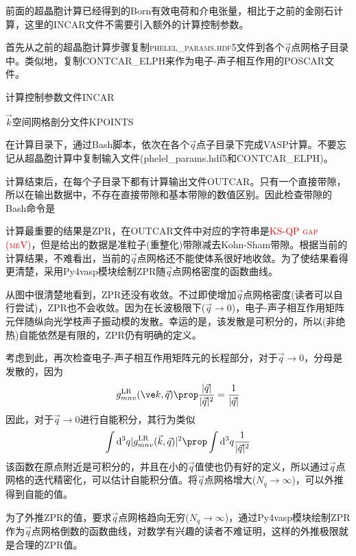 前面的超晶胞计算已经得到的\textrm{Born}有效电荷和介电张量，相比于之前的金刚石计算，这里的\textrm{INCAR}文件不需要引入额外的计算控制参数。

首先从之前的超晶胞计算步骤复制\textsc{phelel\_params.hdf5}文件到各个$\vec q$点网格子目录中。类似地，复制\textrm{CONTCAR\_ELPH}来作为电子-声子相互作用的\textrm{POSCAR}文件。

计算控制参数文件\textrm{INCAR}

$\vec k$空间网格剖分文件\textrm{KPOINTS}

在计算目录下，通过\textrm{Bash}脚本，依次在各个$\vec q$点子目录下完成\textrm{VASP}计算。不要忘记从超晶胞计算中复制输入文件(\textrm{phelel\_params.hdf5}和\textrm{CONTCAR\_ELPH})。

计算结束后，在每个子目录下都有计算输出文件\textrm{OUTCAR}。只有一个直接带隙，所以在输出数据中，不存在直接带隙和基本带隙的数值区别。因此检查带隙的\textrm{Bash}命令是

计算最重要的结果是\textrm{ZPR}，在\textrm{OUTCAR}文件中对应的字符串是\textcolor{red}{\textsc{KS-QP gap (meV)}}，但是给出的数据是准粒子(重整化)带隙减去\textrm{Kohn-Sham}带隙。根据当前的计算结果，不难看出，当前的$\vec q$点网格还不能使体系很好地收敛。为了使结果看得更清楚，采用\textrm{Py4vasp}模块绘制\textrm{ZPR}随$\vec q$点网格密度的函数曲线。

从图中很清楚地看到，\textrm{ZPR}还没有收敛。不过即使增加$\vec q$点网格密度(读者可以自行尝试)，\textrm{ZPR}也不会收敛。因为在长波极限下($\vec q\rightarrow0$)，电子-声子相互作用矩阵元伴随纵向光学枝声子振动模的发散。幸运的是，该发散是可积分的，所以(非绝热)自能依然是有限的，\textrm{ZPR}仍有明确的定义。

考虑到此，再次检查电子-声子相互作用矩阵元的长程部分，对于$\vec q\rightarrow0$，分母是发散的，因为
\begin{displaymath}
	g_{mnv}^{\mathrm{LR}}(\ve k,\vec q)\prop\dfrac{|\vec q|}{|\vec q|^2}=\dfrac1{|\vec q|}
\end{displaymath}
因此，对于$\vec q\rightarrow0$进行自能积分，其行为类似
\begin{displaymath}
	\int\mathrm{d}^3q|g_{mnv}^{\mathrm{LR}}(\vec k,\vec q)|^2\prop\int\mathrm{d}^3q\dfrac1{|\vec q|^2}
\end{displaymath}
该函数在原点附近是可积分的，并且在小的$\vec q$值使也仍有好的定义，所以通过$\vec q$点网格的迭代精密化，可以估计自能积分值。将$\vec q$点网格增大($N_q\rightarrow\infty$)，可以外推得到自能的值。

为了外推\textrm{ZPR}的值，要求$\vec q$点网格趋向无穷($N_q\rightarrow\infty$)，通过\textrm{Py4vasp}模块绘制\textrm{ZPR}作为$\vec q$点网格倒数的函数曲线，对数学有兴趣的读者不难证明，这样的外推极限就是合理的\textrm{ZPR}值。

